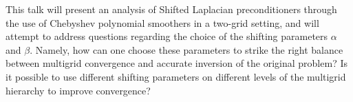 \documentclass{report}
\begin{document}
This talk will present an analysis of Shifted Laplacian preconditioners
through the use of Chebyshev polynomial smoothers in a two-grid setting,
and will attempt to address questions regarding the choice of the
shifting parameters $\alpha$ and $\beta$. Namely, how can one choose
these parameters to strike the right balance between multigrid
convergence and accurate inversion of the original problem? Is it
possible to use different shifting parameters on different levels of the
multigrid hierarchy to improve convergence?
\end{document}
